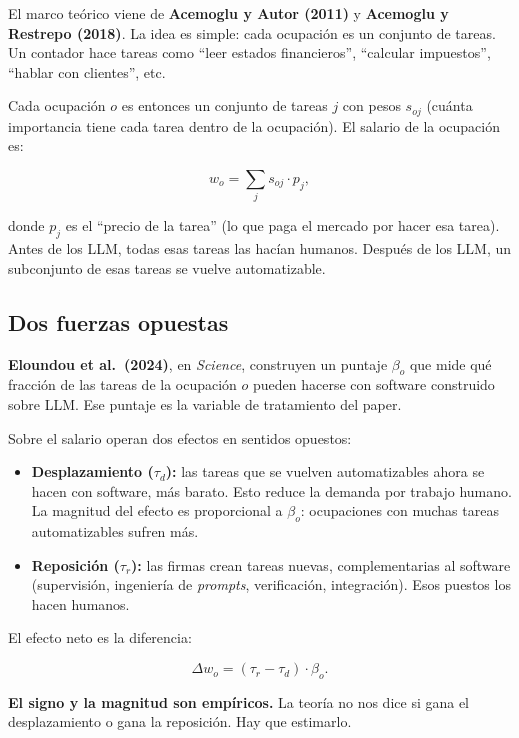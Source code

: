 \documentclass[12pt]{article}
\begin{document}
El marco teórico viene de \textbf{Acemoglu y Autor (2011)} y \textbf{Acemoglu y Restrepo (2018)}. La idea es simple: cada ocupación es un conjunto de tareas. Un contador hace tareas como ``leer estados financieros'', ``calcular impuestos'', ``hablar con clientes'', etc.

Cada ocupación $o$ es entonces un conjunto de tareas $j$ con pesos $s_{oj}$ (cuánta importancia tiene cada tarea dentro de la ocupación). El salario de la ocupación es:

\[
w_o = \sum_j s_{oj} \cdot p_j,
\]

donde $p_j$ es el ``precio de la tarea'' (lo que paga el mercado por hacer esa tarea). Antes de los LLM, todas esas tareas las hacían humanos. Después de los LLM, un subconjunto de esas tareas se vuelve automatizable.

\subsection{Dos fuerzas opuestas}

\textbf{Eloundou et al.\ (2024)}, en \emph{Science}, construyen un puntaje $\beta_o$ que mide qué fracción de las tareas de la ocupación $o$ pueden hacerse con software construido sobre LLM. Ese puntaje es la variable de tratamiento del paper.

Sobre el salario operan dos efectos en sentidos opuestos:

\begin{itemize}
  \item \textbf{Desplazamiento ($\tau_d$):} las tareas que se vuelven automatizables ahora se hacen con software, más barato. Esto reduce la demanda por trabajo humano. La magnitud del efecto es proporcional a $\beta_o$: ocupaciones con muchas tareas automatizables sufren más.
  \item \textbf{Reposición ($\tau_r$):} las firmas crean tareas nuevas, complementarias al software (supervisión, ingeniería de \emph{prompts}, verificación, integración). Esos puestos los hacen humanos.
\end{itemize}

El efecto neto es la diferencia:

\[
\Delta w_o = (\tau_r - \tau_d) \cdot \beta_o.
\]

\begin{ideaclave}
\textbf{El signo y la magnitud son empíricos.} La teoría no nos dice si gana el desplazamiento o gana la reposición. Hay que estimarlo.
\end{ideaclave}
\end{document}
